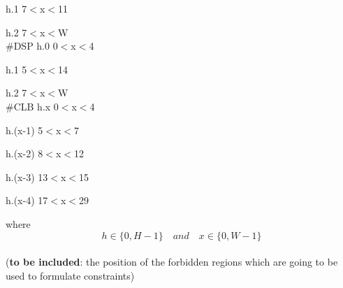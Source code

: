 \documentclass[11pt]{article}
\theoremstyle{definition}
\begin{document}
   					  \hspace{48mm} h.1 \hspace{10mm} 7$<$x$<$11
   					  
   					  \hspace{48mm} h.2 \hspace{10mm} 7$<$x$<$W  \\

\hspace{15mm} \#DSP  \hspace{20mm} h.0 \hspace{10mm}  0$<$x$<$4

					  \hspace{49mm} h.1 \hspace{10mm}  5$<$x$<$14
					  
					  \hspace{49mm} h.2 \hspace{10mm} 7$<$x$<$W   \\

\hspace{15mm} \#CLB  \hspace{20mm} h.x \hspace{15mm}  0$<$x$<$4
					  				  
					  \hspace{48mm} h.(x-1) \hspace{10mm} 5$<$x$<$7
					  
					  \hspace{48mm} h.(x-2) \hspace{10mm} 8$<$x$<$12
					  
					  \hspace{48mm} h.(x-3) \hspace{10mm} 13$<$x$<$15
					  
					  \hspace{48mm} h.(x-4) \hspace{10mm} 17$<$x$<$29
					  
\hspace{15mm} where \[h\in \{0, H-1 \}  \quad and \quad x\in \{0, W-1 \} \] \\

\hspace{15mm} (\textbf{to be included}: the position of the forbidden regions which are going to be used to formulate constraints) \\
\end{document}
